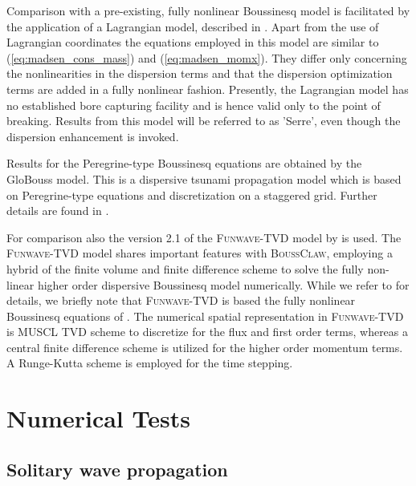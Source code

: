 \documentclass[review]{elsarticle}
\newcommand{\BoussClawt}{\textsc{BoussClaw}}
\begin{document}
Comparison with a pre-existing, fully nonlinear Boussinesq model is
facilitated by the application of a Lagrangian model, described
in \citet{Lovholt:2013a}. Apart from the use of
Lagrangian coordinates the equations employed in this model are
 similar to (\ref{eq:madsen_cons_mass}) and (\ref{eq:madsen_momx}).
They differ only concerning the nonlinearities in the
dispersion terms and that  the dispersion optimization terms are added in a fully nonlinear fashion.
Presently, the Lagrangian model has no established bore capturing 
facility and is hence valid only to the point of breaking.
Results from this model will be referred to as 'Serre', even though
the dispersion enhancement is invoked. 
 
Results for the Peregrine-type Boussinesq equations are obtained by the
GloBouss model. This is a dispersive tsunami propagation model which
is based on Peregrine-type equations and discretization on a staggered grid. Further details are found in 
\citet{Lovholt:2008b}.

For comparison also the version 2.1 of the  \textsc{Funwave-TVD} model
by \citet{shi2012high} is used. The
\textsc{Funwave-TVD} model shares important features with \BoussClawt, employing a hybrid 
of the finite volume and finite difference
scheme to solve the fully non-linear higher order dispersive Boussinesq model numerically.
While we refer to \citet{shi2012high} for details, we briefly note that \textsc{Funwave-TVD} is based the fully nonlinear 
Boussinesq equations of \citet{Chen06}. The numerical spatial representation in \textsc{Funwave-TVD} is MUSCL TVD scheme 
to discretize for the flux and first order terms, 
whereas a central finite difference
scheme \citet{Wei95} is utilized for the higher order momentum terms. A Runge-Kutta scheme is employed for the time stepping.

\section{Numerical Tests}
\label{sec:num_nonbreaking}

\subsection{Solitary wave propagation}
\end{document}
